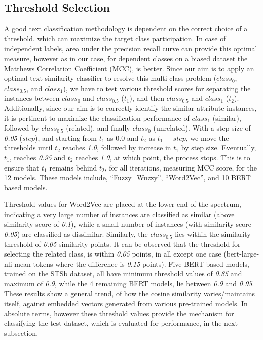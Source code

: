 \documentclass{ieeeaccess}
\begin{document}
\subsection{Threshold Selection}
A good text classification methodology is dependent on the correct choice of a threshold, which can maximize the target class participation. In case of independent labels, area under the precision recall curve can provide this optimal measure, however as in our case, for dependent classes on a biased dataset the Matthews Correlation Coefficient (MCC), is better\cite{chicco2020advantages}.
Since our aim is to apply an optimal text similarity classifier to resolve this multi-class problem ($class_0$, $class_{0.5}$, and $class_1$), we have to test various threshold scores for separating the instances between $class_0$ and $class_{0.5}$ ($t_1$), and then $class_{0.5}$ and $class_1$ ($t_2$). Additionally, since our aim is to correctly identify the similar attribute instances, it is pertinent to maximize the classification performance of $class_1$ (similar), followed by $class_{0.5}$ (related), and finally $class_0$ (unrelated).
With a step size of \textit{0.05} ($step$), and starting from $t_1$ as 0.0 and $t_2$ as $t_1$ + $step$, we move the thresholds until $t_2$ reaches \textit{1.0}, followed by increase in $t_1$ by step size. Eventually, $t_1$, reaches \textit{0.95} and $t_2$ reaches \textit{1.0}, at which point, the process stops. This is to ensure that $t_1$ remains behind $t_2$, for all iterations, measuring MCC score, for the 12 models. These models include, ``Fuzzy\_Wuzzy'', ``Word2Vec'', and 10 BERT based models.

Threshold values for Word2Vec are placed at the lower end of the spectrum, indicating a very large number of instances are classified as similar (above similarity score of \textit{0.1}), while a small number of instances (with similarity score \textit{0.05}) are classified as dissimilar. Similarly, the $class_{0.5}$ lies within the similarity threshold of \textit{0.05} similarity points. It can be observed that the threshold for selecting the related class, is within \textit{0.05} points, in all except one case (bert-large-nli-mean-tokens where the difference is \textit{0.15} points). Five BERT based models, trained on the STSb dataset, all have minimum threshold values of \textit{0.85} and maximum of \textit{0.9}, while the 4 remaining BERT models, lie between \textit{0.9} and \textit{0.95}. These results show a general trend, of how the cosine similarity varies/maintains itself, against embedded vectors generated from various pre-trained models. In absolute terms, however these threshold values provide the mechanism for classifying the test dataset, which is evaluated for performance, in the next subsection.
\end{document}
